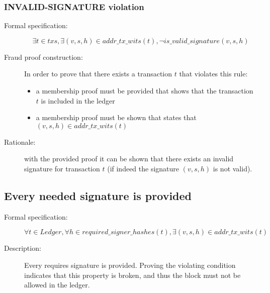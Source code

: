 \documentclass[../midgard.tex]{subfiles}
\begin{document}
\subsubsection{INVALID-SIGNATURE violation}
\label{violation:INVALID-SIGNATURE}

\begin{description}

\item[Formal specification:]
\begin{equation*}
    \exists t \in txs, \exists (v, s, h) \in addr\_tx\_wits(t), \lnot is\_valid\_signature(v, s, h)
\end{equation*}

\item[Fraud proof construction:] In order to prove that there exists a transaction $t$ that violates this rule:
\begin{itemize}
    \item a membership proof must be provided that shows that the transaction $t$ is included in the ledger
    \item a membership proof must be shown that states that $(v, s, h) \in addr\_tx\_wits(t)$
\end{itemize}

\item[Rationale:] with the provided proof it can be shown that there exists an invalid signature for transaction $t$ (if indeed the signature $(v, s, h)$ is not valid).

\end{description}

\subsection{Every needed signature is provided}
\label{rule:every-needed-signature-is-provided}

\begin{description}

\item[Formal specification:]
\begin{equation*}
    \forall t \in Ledger, \forall h \in required\_signer\_hashes(t), \exists (v, s, h) \in addr\_tx\_wits(t)
\end{equation*}
        
\item[Description:] Every requires signature is provided.
  Proving the violating condition indicates that this property is broken, and thus the block must not be allowed in the ledger.

\end{description}
\end{document}
